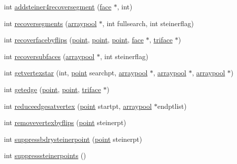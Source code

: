 \begin{DoxyCompactItemize}
\item 
int \hyperlink{classtetgenmesh_a9d878a0e64588b0471a58e534affea8e}{addsteiner4recoversegment} (\hyperlink{classtetgenmesh_1_1face}{face} $\ast$, int)
\item 
int \hyperlink{classtetgenmesh_a50e12e269b11573e6e1b91347ad19b37}{recoversegments} (\hyperlink{classtetgenmesh_1_1arraypool}{arraypool} $\ast$, int fullsearch, int steinerflag)
\item 
int \hyperlink{classtetgenmesh_a38c7fc92a1ced3f4885006837a83c2e6}{recoverfacebyflips} (\hyperlink{classtetgenmesh_ace3fb4f80389185b7c9b18ab69a3dea2}{point}, \hyperlink{classtetgenmesh_ace3fb4f80389185b7c9b18ab69a3dea2}{point}, \hyperlink{classtetgenmesh_ace3fb4f80389185b7c9b18ab69a3dea2}{point}, \hyperlink{classtetgenmesh_1_1face}{face} $\ast$, \hyperlink{classtetgenmesh_1_1triface}{triface} $\ast$)
\item 
int \hyperlink{classtetgenmesh_ace09080e4f274e0a48cd1728475878c9}{recoversubfaces} (\hyperlink{classtetgenmesh_1_1arraypool}{arraypool} $\ast$, int steinerflag)
\item 
int \hyperlink{classtetgenmesh_a9ba3540239e05588c5a2021b15d89a8e}{getvertexstar} (int, \hyperlink{classtetgenmesh_ace3fb4f80389185b7c9b18ab69a3dea2}{point} searchpt, \hyperlink{classtetgenmesh_1_1arraypool}{arraypool} $\ast$, \hyperlink{classtetgenmesh_1_1arraypool}{arraypool} $\ast$, \hyperlink{classtetgenmesh_1_1arraypool}{arraypool} $\ast$)
\item 
int \hyperlink{classtetgenmesh_ae680a6f607f14655b0078e066a95bc34}{getedge} (\hyperlink{classtetgenmesh_ace3fb4f80389185b7c9b18ab69a3dea2}{point}, \hyperlink{classtetgenmesh_ace3fb4f80389185b7c9b18ab69a3dea2}{point}, \hyperlink{classtetgenmesh_1_1triface}{triface} $\ast$)
\item 
int \hyperlink{classtetgenmesh_af61e64f6536238f25296f3f26b360935}{reduceedgesatvertex} (\hyperlink{classtetgenmesh_ace3fb4f80389185b7c9b18ab69a3dea2}{point} startpt, \hyperlink{classtetgenmesh_1_1arraypool}{arraypool} $\ast$endptlist)
\item 
int \hyperlink{classtetgenmesh_ad3277eea82fb5eb134c5eaa6abf5c18d}{removevertexbyflips} (\hyperlink{classtetgenmesh_ace3fb4f80389185b7c9b18ab69a3dea2}{point} steinerpt)
\item 
int \hyperlink{classtetgenmesh_aae5530d808e30771e717c94cb8586f0b}{suppressbdrysteinerpoint} (\hyperlink{classtetgenmesh_ace3fb4f80389185b7c9b18ab69a3dea2}{point} steinerpt)
\item 
int \hyperlink{classtetgenmesh_affc448708b6df2b57048544d3efd6e3c}{suppresssteinerpoints} ()

\end{DoxyCompactItemize}

